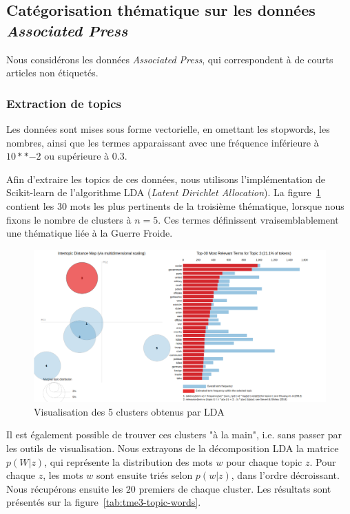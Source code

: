 \documentclass[a4paper]{article}
\newcommand{\figref}[1]{figure~\ref{#1}}
\begin{document}
\subsection{Catégorisation thématique sur les données \emph{Associated Press}}

Nous considérons les données \emph{Associated Press}, qui correspondent à de
courts articles non étiquetés. 

\subsubsection{Extraction de topics}

Les données sont mises sous forme vectorielle, en omettant les stopwords, les
nombres, ainsi que les termes apparaissant avec une fréquence inférieure à
$10**{-2}$ ou supérieure à $0.3$. 

Afin d'extraire les topics de ces données, nous utilisons l'implémentation de
Scikit-learn \cite{scikit} de l'algorithme LDA (\emph{Latent Dirichlet
Allocation}). La \figref{img:tme3-vis-5} contient les 30 mots les plus
pertinents de la troisième thématique, lorsque nous fixons le nombre de clusters
à $n=5$. Ces termes définissent vraisemblablement une thématique liée à la
Guerre Froide. 

\begin{figure}[H]
	\center 
	\includegraphics[width=1.2\textwidth]{images/tme3/vis_5.png}
    \caption{Visualisation des 5 clusters obtenus par LDA}
    \label{img:tme3-vis-5}
\end{figure}

Il est également possible de trouver ces clusters "à la main", i.e. sans passer
par les outils de visualisation. Nous extrayons de la décomposition LDA la
matrice $p(W|z)$, qui représente la distribution des mots $w$ pour chaque topic
$z$. Pour chaque $z$, les mots $w$ sont ensuite triés selon $p(w|z)$, dans
l'ordre décroissant. Nous récupérons ensuite les $20$ premiers de chaque
cluster. Les résultats sont présentés sur la \figref{tab:tme3-topic-words}.
\end{document}
